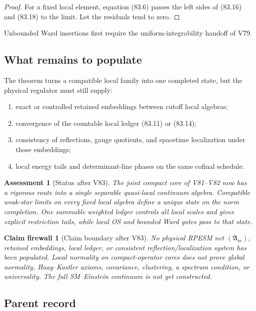 \documentclass[11pt]{article}
\newtheorem{firewall}[theorem]{Claim firewall}
\newtheorem{assessment}[theorem]{Assessment}
\theoremstyle{remark}
\begin{document}
\begin{proof}
For a fixed local element, equation (83.6) passes the left sides of
(83.16) and (83.18) to the limit.  Let the residuals tend to zero.
\end{proof}

Unbounded Ward insertions first require the uniform-integrability
handoff of V79.

\subsection{What remains to populate}

The theorem turns a compatible local family into one completed
state, but the physical regulator must still supply:
\begin{enumerate}
\item exact or controlled retained embeddings between cutoff local
      algebras;
\item convergence of the countable local ledger (83.11) or (83.14);
\item consistency of reflections, gauge quotients, and spacetime
      localization under those embeddings;
\item local energy tails and determinant-line phases on the same
      cofinal schedule.
\end{enumerate}

\begin{assessment}[Status after V83]
\label{ass:v12v83-status}
The joint compact core of V81--V82 now has a rigorous route into a
single separable quasi-local continuum algebra.  Compatible
weak-star limits on every fixed local algebra define a unique state
on the norm completion.  One summable weighted ledger controls all
local scales and gives explicit restriction tails, while local OS
and bounded Ward gates pass to that state.
\end{assessment}

\begin{firewall}[Claim boundary after V83]
\label{fire:v12v83-claim}
No physical RPESM net
\(({\mathfrak A}_m)\), retained embeddings, local ledger, or
consistent reflection/localization system has been populated.
Local normality on compact-operator cores does not prove global
normality, Haag--Kastler axioms, covariance, clustering, a spectrum
condition, or universality.  The full SM--Einstein continuum is not
yet constructed.
\end{firewall}

\subsection{Parent record}
\end{document}
